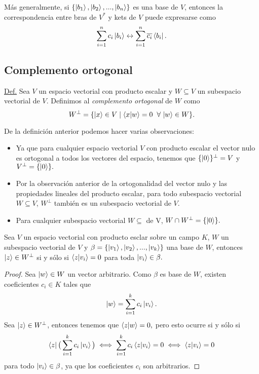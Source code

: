 \documentclass[12pt,dvipsnames]{article}
\newenvironment{lema}[2][Lema]{\begin{trivlist}
\item[\hskip \labelsep {\bfseries #1}\hskip \labelsep {\bfseries}]}{\end{trivlist}}
\begin{document}
Más generalmente, si $\{\ket{b_1},\ket{b_2},...,\ket{b_n}\}$ es una base de $V$, entonces la correspondencia entre bras de $V^*$ y kets de $V$ puede expresarse como \[
    \sum_{i=1}^n c_i \ket{b_i} \leftrightarrow \sum_{i=1}^n \overline{c_i}\bra{b_i}
.\]    

\newpage
\subsection{Complemento ortogonal} \label{Subsec:Complemento_ortogonal} 

\begin{tcolorbox}
    \underline{Def.} Sea $V$ un espacio vectorial con producto escalar y $W\subseteq V$ un subespacio vectorial de $V$. Definimos al \emph{complemento ortogonal} de $W$ como \[
        W^{\perp}=\{\ket{x}\in V\mid \braket{x|w}=0\hspace{2mm}\forall\hspace{0.5mm} \ket{w}\in W\} 
    .\] 
\end{tcolorbox}

\noindent De la definición anterior podemos hacer varias observaciones:
\begin{itemize}
    \item Ya que para cualquier espacio vectorial $V$ con producto escalar el vector nulo es ortogonal a todos los vectores del espacio, tenemos que $\{\ket{0}\}^{\perp}=V$ y $V^{\perp}=\{\ket{0}\}.$
    \item Por la observación anterior de la ortogonalidad del vector nulo y las propiedades lineales del producto escalar, para todo subespacio vectorial $W\subseteq V$, $W^{\perp}$ también es un subespacio vectorial de $V$.
    \item Para cualquier subespacio vectorial $W\subseteq$ de V, $W\cap W^{\perp}=\{\ket{0}\}.$
\end{itemize}

\begin{lema}\empty
    Sea $V$ un espacio vectorial con producto esclar sobre un campo $K$, $W$ un subespacio vectorial de $V$ y $\beta=\{\ket{v_1}, \ket{v_2},..., \ket{v_k}\}$ una base de $W$, entonces $\ket{z}\in W^{\perp}$ si y sólo si $\braket{z|v_i}=0$ para toda $\ket{v_i}\in\beta.$

    \begin{proof}
        Sea $\ket{w}\in W$ un vector arbitrario. Como $\beta$ es base de $W$, existen coeficientes $c_i\in K$ tales que \[
            \ket{w}=\sum_{i=1}^k c_i\ket{v_i}
        .\] \noindent Sea $\ket{z}\in W^{\perp}$, entonces tenemos que $\braket{z|w}=0,$ pero esto ocurre si y sólo si \[
        \bra{z}\big(\sum_{i=1}^k c_i\ket{v_i}\big)\iff \sum_{i=1}^k c_i \braket{z|v_i}=0\iff \braket{z|v_i}=0
    \] \noindent para todo $\ket{v_i}\in\beta$, ya que los coeficientes $c_i$ son arbitrarios. 
    \end{proof}

\end{lema}
\end{document}

